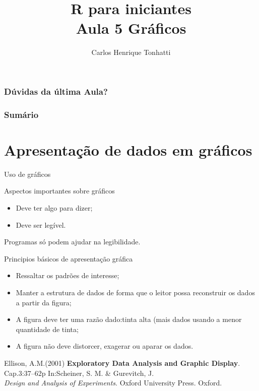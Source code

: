 \documentclass{beamer}
\title[Linguagem R]{R para iniciantes\\ Aula 5 Gráficos}
\author {Carlos Henrique Tonhatti}
\institute[Unicamp]{Universidade Estadual de Campinas}
\begin{document}
\frame{\titlepage} %

\begin{frame}
  \frametitle{Dúvidas da última Aula?}
\end{frame}

\begin{frame}
 \frametitle{Sumário}
 \tableofcontents[pausesections]
  \setcounter{tocdepth}{2}%
\end{frame}



\section{Apresentação de dados em gráficos}

\begin{frame}{Uso de gráficos}
\centering
{}
\end{frame}

\begin{frame}{Aspectos importantes sobre gráficos}

  \begin{itemize}
  \item Deve ter algo para dizer;
  \item Deve ser legível. 
  \end{itemize}
\pause
Programas só podem ajudar na legibilidade.   
\end{frame}

\begin{frame}{Principios básicos de apresentação gráfica}
  \begin{itemize}[<+->]
  \item Ressaltar os padrões de interesse;
  \item Manter a estrutura de dados de forma que o leitor possa reconstruir os dados a partir da figura;
  \item A figura deve ter uma razão dado:tinta alta (mais dados usando a menor quantidade de tinta;
  \item A figura não deve distorcer, exagerar ou aparar os dados.
  \end{itemize}
  \vfill{} \pause 
\tiny{Ellison, A.M.(2001) \textbf{Exploratory Data Analysis and Graphic Display}. Cap.3:37--62p In:Scheiner, S. M. \& Gurevitch, J.\\\hspace{20pt} \textit{Design and Analysis of Experiments}. Oxford University Press. Oxford.}
\end{frame}
\end{document}
